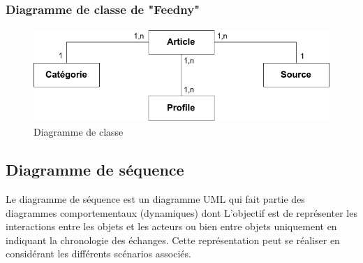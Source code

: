 \subsubsection{Diagramme de classe de "Feedny"}
\begin{figure}[H]
    \centering
    \includegraphics[height=100pt,width=320pt]{img/chapter3/classdiagram.png}
    \caption{Diagramme de classe}
\end{figure}

\subsection{Diagramme de séquence}
Le diagramme de séquence est un diagramme UML qui fait partie des diagrammes comportementaux (dynamiques) dont L'objectif est de représenter les interactions entre les objets et les acteurs ou bien entre objets uniquement  en indiquant la chronologie des échanges. Cette représentation peut se réaliser en considérant les différents scénarios associés.

